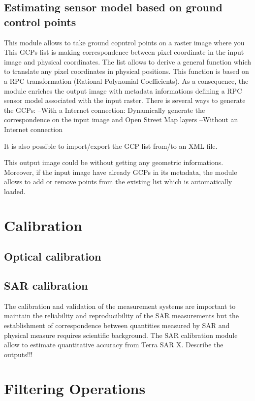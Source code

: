 \documentclass{InsightSoftwareGuide}
\begin{document}
\subsection{Estimating sensor model based on ground control points}
This module allows to take ground copntrol points on a raster image where you 
This GCPs list is making correspondence between pixel coordinate in the input image and physical coordinates. The list
allows to derive a general function which to translate any pixel coordinates in physical positions. This function is 
based on a RPC transformation (Rational Polynomial Coefficients). As a consequence, the module enriches the output image 
with metadata informations defining a RPC sensor model associated with the input raster. 
There is several ways to generate the GCPs:
--With a Internet connection: Dynamically generate the correspondence on the input image and Open Street Map layers
--Without an  Internet connection

It is also possible to import/export the GCP list from/to an XML file.

This output image could be without getting any geometric informations. Moreover, if the input image have already GCPs
in its metadata, the module allows to add or remove points from the existing list which is automatically loaded.       

\section{Calibration}

\subsection{Optical calibration}
\subsection{SAR calibration}

The calibration and validation of the measurement systems are important to maintain the
reliability and reproducibility of the SAR measurements but the establishment of correspondence between quantities measured 
by SAR and physical measure requires scientific background. The SAR calibration module allow to estimate quantitative accuracy
from Terra SAR X.
Describe the outputs!!!

\section{Filtering Operations}
\end{document}
